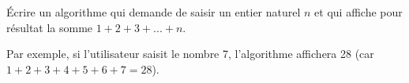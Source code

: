 
%
Écrire un algorithme qui demande de saisir un entier naturel $n$ et qui affiche pour résultat la somme $1+2+3+. . . +n$.
\par
Par exemple, si l'utilisateur saisit le nombre 7, l'algorithme affichera 28 (car $1+2+3+4+5+6+7=28$).
\begin{corrige}


\end{corrige}

